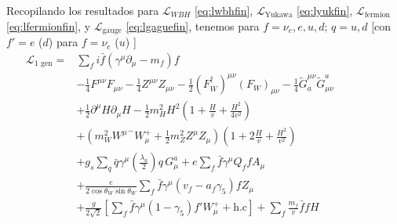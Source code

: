 Recopilando los resultados para $\mathcal{L}_{WBH}$ \eqref{eq:lwbhfin}, $\mathcal{L}_{\text{Yukawa}}$ \eqref{eq:lyukfin}, $\mathcal{L}_{\text{fermion}}$ \eqref{eq:lfermionfin}, y $\mathcal{L}_{\text{gauge}}$ \eqref{eq:lgaguefin}, tenemos  para $f=\nu_e,e,u,d$; $q=u,d$ [con $f'=e$ ($d$) para $f=\nu_e$ ($u$) ]
\begin{align}
  \mathcal{L}_{\text{1 gen}}=&\sum_f i\bar{f}\left(\gamma^\mu\partial_\mu-m_f\right)f\nonumber\\
&-\tfrac{1}{4}F^{\mu\nu} F_{\mu\nu}-\tfrac{1}{4}Z^{\mu\nu} Z_{\mu\nu}-\tfrac{1}{2}(F_W^\dagger)^{\mu\nu} (F_W)_{\mu\nu}
- \tfrac{1}{4}\widetilde{G}^{\mu\nu}_a \widetilde{G}_{\mu\nu}^a\nonumber\\
&+\tfrac{1}{2}\partial^\mu H\partial_\mu H
-\frac{1}{2}m_H^2H^2\left(1+\frac{H}{v}+\frac{H^2}{4v^2}\right)\nonumber\\
&+\left(m_W^2{W^\mu}^-W_\mu^++\frac{1}{2}m_Z^2Z^\mu Z_\mu\right)\left(1+2\frac{H}{v}+\frac{H^2}{v^2}\right)\nonumber\\
&+g_s\sum_q\bar{q}\gamma^\mu\left(\frac{\lambda_a}{2}\right)q\,G_\mu^a+e\sum_f \bar{f}\gamma^\mu Q_f f A_\mu\nonumber\\
&+\frac{e}{2\cos\theta_W\sin\theta_W}\sum_{f}\bar{f}\gamma^\mu(v_f-a_f\gamma_5)f Z_\mu\nonumber\\
&+\frac{g}{2\sqrt{2}}\left[\sum_{f}\bar{f}\gamma^\mu(1-\gamma_5)f' W_\mu^++\text{h.c}\right]
+\sum_f \frac{m_f}{v} \bar{f}f H\nonumber\\
&\phantom{- \frac{1}{4}\left(g_s\widetilde{G}^{\mu\nu}_af_{a d e}G^d_\mu G^e_\nu
    +g_sf^{a b c}G_b^\mu G_c^\nu\widetilde{G}_{\mu\nu}^a
    +g_s^2f^{a b c}f_{a d e}G_b^\mu G_c^\nu G^d_\mu G^e_\nu\right)\,.}\nonumber
\end{align}






